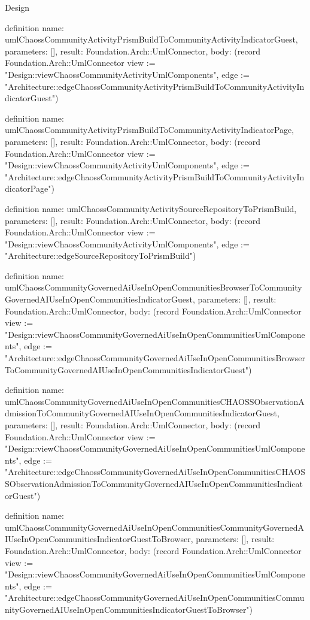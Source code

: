 \begin{lexlean}{Design}
\begin{semanticmodule}
definition{
  name: umlChaossCommunityActivityPrismBuildToCommunityActivityIndicatorGuest,
  parameters: [],
  result: Foundation.Arch::UmlConnector,
  body: (record Foundation.Arch::UmlConnector {view := "Design::viewChaossCommunityActivityUmlComponents", edge := "Architecture::edgeChaossCommunityActivityPrismBuildToCommunityActivityIndicatorGuest"})
}

definition{
  name: umlChaossCommunityActivityPrismBuildToCommunityActivityIndicatorPage,
  parameters: [],
  result: Foundation.Arch::UmlConnector,
  body: (record Foundation.Arch::UmlConnector {view := "Design::viewChaossCommunityActivityUmlComponents", edge := "Architecture::edgeChaossCommunityActivityPrismBuildToCommunityActivityIndicatorPage"})
}

definition{
  name: umlChaossCommunityActivitySourceRepositoryToPrismBuild,
  parameters: [],
  result: Foundation.Arch::UmlConnector,
  body: (record Foundation.Arch::UmlConnector {view := "Design::viewChaossCommunityActivityUmlComponents", edge := "Architecture::edgeSourceRepositoryToPrismBuild"})
}

definition{
  name: umlChaossCommunityGovernedAiUseInOpenCommunitiesBrowserToCommunityGovernedAIUseInOpenCommunitiesIndicatorGuest,
  parameters: [],
  result: Foundation.Arch::UmlConnector,
  body: (record Foundation.Arch::UmlConnector {view := "Design::viewChaossCommunityGovernedAiUseInOpenCommunitiesUmlComponents", edge := "Architecture::edgeChaossCommunityGovernedAiUseInOpenCommunitiesBrowserToCommunityGovernedAIUseInOpenCommunitiesIndicatorGuest"})
}

definition{
  name: umlChaossCommunityGovernedAiUseInOpenCommunitiesCHAOSSObservationAdmissionToCommunityGovernedAIUseInOpenCommunitiesIndicatorGuest,
  parameters: [],
  result: Foundation.Arch::UmlConnector,
  body: (record Foundation.Arch::UmlConnector {view := "Design::viewChaossCommunityGovernedAiUseInOpenCommunitiesUmlComponents", edge := "Architecture::edgeChaossCommunityGovernedAiUseInOpenCommunitiesCHAOSSObservationAdmissionToCommunityGovernedAIUseInOpenCommunitiesIndicatorGuest"})
}

definition{
  name: umlChaossCommunityGovernedAiUseInOpenCommunitiesCommunityGovernedAIUseInOpenCommunitiesIndicatorGuestToBrowser,
  parameters: [],
  result: Foundation.Arch::UmlConnector,
  body: (record Foundation.Arch::UmlConnector {view := "Design::viewChaossCommunityGovernedAiUseInOpenCommunitiesUmlComponents", edge := "Architecture::edgeChaossCommunityGovernedAiUseInOpenCommunitiesCommunityGovernedAIUseInOpenCommunitiesIndicatorGuestToBrowser"})
}


\end{semanticmodule}
\end{lexlean}

